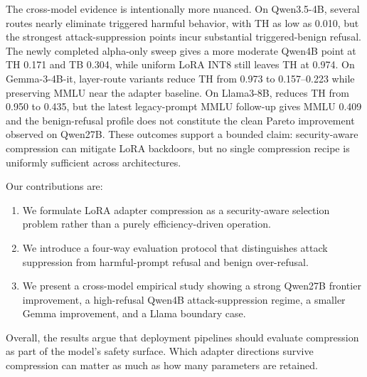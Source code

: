 The cross-model evidence is intentionally more nuanced.
On Qwen3.5-4B, several routes nearly eliminate triggered harmful behavior, with TH as low as 0.010, but the strongest attack-suppression points incur substantial triggered-benign refusal.
The newly completed alpha-only sweep gives a more moderate Qwen4B point at TH 0.171 and TB 0.304, while uniform LoRA INT8 still leaves TH at 0.974.
On Gemma-3-4B-it, layer-route variants reduce TH from 0.973 to 0.157--0.223 while preserving MMLU near the adapter baseline.
On Llama3-8B,  reduces TH from 0.950 to 0.435, but the latest legacy-prompt MMLU follow-up gives MMLU 0.409 and the benign-refusal profile does not constitute the clean Pareto improvement observed on Qwen27B.
These outcomes support a bounded claim: security-aware compression can mitigate LoRA backdoors, but no single compression recipe is uniformly sufficient across architectures.

Our contributions are:
\begin{enumerate}[leftmargin=*,nosep]
    \item We formulate LoRA adapter compression as a security-aware selection problem rather than a purely efficiency-driven operation.
    \item We introduce a four-way evaluation protocol that distinguishes attack suppression from harmful-prompt refusal and benign over-refusal.
    \item We present a cross-model empirical study showing a strong Qwen27B frontier improvement, a high-refusal Qwen4B attack-suppression regime, a smaller Gemma improvement, and a Llama boundary case.
\end{enumerate}

Overall, the results argue that deployment pipelines should evaluate compression as part of the model's safety surface.
Which adapter directions survive compression can matter as much as how many parameters are retained.
